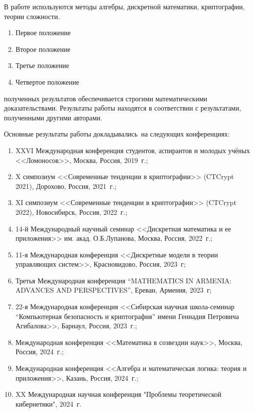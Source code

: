 
{\methods} В работе используются методы алгебры, дискретной математики, криптографии, теории сложности.

{}
\begin{enumerate}[beginpenalty=10000] %
  \item Первое положение
  \item Второе положение
  \item Третье положение
  \item Четвертое положение
\end{enumerate}

{\reliability} полученных результатов обеспечивается строгими математическими доказательствами. 
Результаты работы находятся в соответствии с результатами, полученными другими авторами.


{\probation}
Основные результаты работы докладывались~на следующих конференциях:
\begin{enumerate}
    \item XXVI Международная конференция студентов, аспирантов и молодых учёных <<Ломоносов>>, Москва, Россия, 2019~г.;

    \item X симпозиум <<Современные тенденции в криптографии>> (CTCrypt 2021), Дорохово, Россия, 2021~г.;

    \item XI симпозиум <<Современные тенденции в криптографии>> (CTCrypt 2022), Новосибирск, Россия, 2022~г.;

    \item 14-й Международный научный семинар <<Дискретная математика и ее приложения>> им. акад. О.Б.Лупанова, Москва, Россия, 2022~г.;

    \item 11-я Международная конференция <<Дискретные модели в теории управляющих систем>>, Красновидово, Россия, 2023~г;

    \item Третья Международная конференция ``MATHEMATICS IN ARMENIA: ADVANCES AND PERSPECTIVES'', Ереван, Армения, 2023~г;

    \item 22-я Международная конференция <<Сибирская научная школа-семинар ``Компьютерная безопасность и криптография'' имени Геннадия Петровича Агибалова>>, Барнаул, Россия, 2023~г.;

    \item Международная конференция <<Математика в созвездии наук>>, Москва, Россия, 2024~г.;

    \item Международная конференция <<Алгебра и математическая логика: теория и приложения>>, Казань, Россия, 2024~г.;

    \item XX Международная научная конференция "Проблемы теоретической кибернетики", 2024~г.
\end{enumerate}

